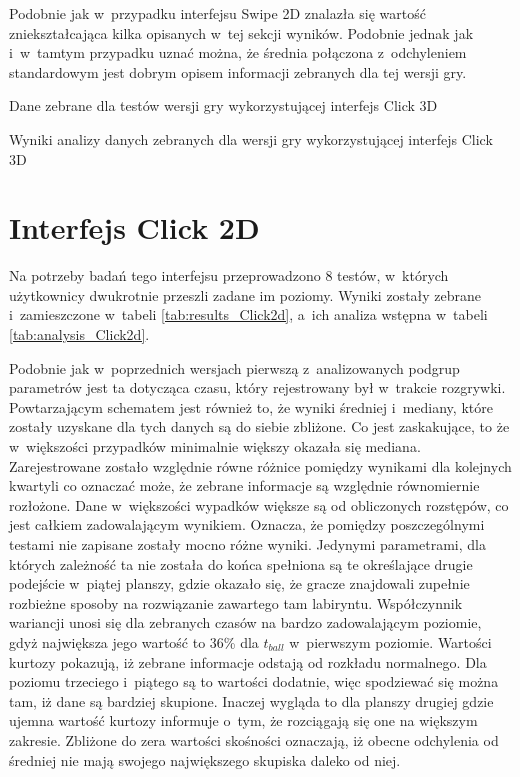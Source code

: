 \documentclass[a4paper,12pt,numbers=noenddot]{report}
\begin{document}
Podobnie jak w~przypadku interfejsu Swipe 2D znalazła się wartość zniekształcająca kilka opisanych w~tej sekcji wyników. Podobnie jednak jak i~w~tamtym przypadku uznać można, że średnia połączona z~odchyleniem standardowym jest dobrym opisem informacji zebranych dla tej wersji gry. 

\begin{table}
  \caption{Dane zebrane dla testów wersji gry wykorzystującej interfejs Click 3D}
  \resizebox{0.9\textwidth}{!}{%
	
  }
  \label{tab:results_Click3d}%
  \caption{Wyniki analizy danych zebranych dla wersji gry wykorzystującej interfejs Click 3D}
  \resizebox{0.9\textwidth}{!}{%
	
  }
  \label{tab:analysis_Click3d}%
\end{table}%


\section{Interfejs Click 2D}%
Na potrzeby badań tego interfejsu przeprowadzono 8 testów, w~których użytkownicy dwukrotnie przeszli zadane im poziomy. Wyniki zostały zebrane i~zamieszczone w~tabeli \ref{tab:results_Click2d}, a~ich analiza wstępna w~tabeli \ref{tab:analysis_Click2d}.

Podobnie jak w~poprzednich wersjach pierwszą z~analizowanych podgrup parametrów jest ta dotycząca czasu, który rejestrowany był w~trakcie rozgrywki. Powtarzającym schematem jest również to, że wyniki średniej i~mediany, które zostały uzyskane dla tych danych są do siebie zbliżone. Co jest zaskakujące, to że w~większości przypadków minimalnie większy okazała się mediana. Zarejestrowane zostało względnie równe różnice pomiędzy wynikami dla kolejnych kwartyli co oznaczać może, że zebrane informacje są względnie równomiernie rozłożone. Dane w~większości wypadków większe są od obliczonych rozstępów, co jest całkiem zadowalającym wynikiem. Oznacza, że pomiędzy poszczególnymi testami nie zapisane zostały mocno różne wyniki. Jedynymi parametrami, dla których zależność ta nie została do końca spełniona są te określające drugie podejście w~piątej planszy, gdzie okazało się, że gracze znajdowali zupełnie rozbieżne sposoby na rozwiązanie zawartego tam labiryntu. Współczynnik wariancji unosi się dla zebranych czasów na bardzo zadowalającym poziomie, gdyż największa jego wartość to 36\% dla $t_{ball}$ w~pierwszym poziomie. Wartości kurtozy pokazują, iż zebrane informacje odstają od rozkładu normalnego. Dla poziomu trzeciego i~piątego są to wartości dodatnie, więc spodziewać się można tam, iż dane są bardziej skupione. Inaczej wygląda to dla planszy drugiej gdzie ujemna wartość kurtozy informuje o~tym, że rozciągają się one na większym zakresie. Zbliżone do zera wartości skośności oznaczają, iż obecne odchylenia od średniej nie mają swojego największego skupiska daleko od niej.
\end{document}

